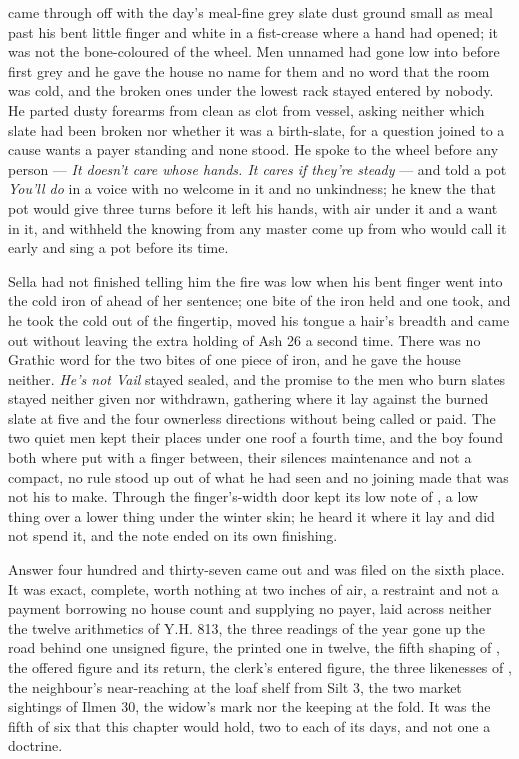  came through  off  with the day's meal-fine grey slate dust ground small as meal past his bent little finger and white in a fist-crease where a hand had opened; it was not the bone-coloured  of the wheel. Men unnamed had gone low into  before first grey and he gave the house no name for them and no word that the room was cold, and the broken ones under the lowest rack stayed entered by nobody. He parted dusty forearms from clean as clot from vessel, asking neither which slate had been broken nor whether it was a birth-slate, for a question joined to a cause wants a payer standing and none stood. He spoke to the wheel before any person --- \emph{It doesn't care whose hands. It cares if they're steady} --- and told a pot \emph{You'll do} in a voice with no welcome in it and no unkindness; he knew the  that pot would give three turns before it left his hands, with air under it and a want in it, and withheld the knowing from any master come up from  who would call it early and sing a pot before its time.

Sella had not finished telling him the fire was low when his bent finger went into the cold iron of  ahead of her sentence; one bite of the iron held and one took, and he took the cold out of the fingertip, moved his tongue a hair's breadth and came out without leaving the extra holding of Ash 26 a second time. There was no Grathic word for the two bites of one piece of iron, and he gave the house neither. \emph{He's not Vail} stayed sealed, and the promise to the men who burn slates stayed neither given nor withdrawn, gathering where it lay against the burned slate at five and the four ownerless directions without being called or paid. The two quiet men kept their places under one roof a fourth time, and the boy found both where put with a finger between, their silences maintenance and not a compact, no rule stood up out of what he had seen and no joining made that was not his to make. Through the finger's-width door  kept its low note of , a low thing over a lower thing under the winter skin; he heard it where it lay and did not spend it, and the note ended on its own finishing.

\scenebreak

Answer four hundred and thirty-seven came out and was filed on the sixth place. It was exact, complete, worth nothing at two inches of air, a restraint and not a payment borrowing no house count and supplying no payer, laid across neither the twelve arithmetics of Y.H. 813, the three readings of the year gone up the road behind one unsigned figure, the printed one in twelve, the fifth shaping of , the offered figure and its return, the clerk's entered figure, the three likenesses of , the neighbour's near-reaching at the loaf shelf from Silt 3, the two market sightings of Ilmen 30, the widow's mark nor the keeping at the fold. It was the fifth of six that this chapter would hold, two to each of its days, and not one a doctrine.

